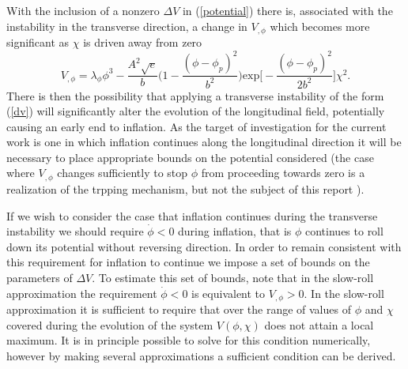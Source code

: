 \documentclass[letterpaper,11pt]{article}
\begin{document}
With the inclusion of a nonzero $\Delta V$ in (\ref{potential}) there is, associated with the instability in the transverse direction, a change in $V_{,\phi}$ which becomes more significant as $\chi$ is driven away from zero
\begin{equation}
V_{,\phi} = \lambda_{\phi}\phi^3 - \frac{A^2\sqrt{e}}{b}\bigg(1 - \frac{(\phi-\phi_p)^2}{b^2}\bigg)\mathrm{exp}\bigg[-\frac{(\phi-\phi_p)^2}{2b^2}\bigg]\chi^2. \label{dv phi}
\end{equation}
There is then the possibility that applying a transverse instability of the form (\ref{dv}) will significantly alter the evolution of the longitudinal field, potentially causing an early end to inflation. As the target of investigation for the current work is one in which inflation continues along the longitudinal direction it will be necessary to place appropriate bounds on the potential considered (the case where $V_{,\phi}$ changes sufficiently to stop $\phi$ from proceeding towards zero is a realization of the trpping mechanism, but not the subject of this report \cite{kofman}).

If we wish to consider the case that inflation continues during the transverse instability we should require $\dot{\phi}<0$ during inflation, that is $\phi$ continues to roll down its potential without reversing direction. In order to remain consistent with this requirement for inflation to continue we impose a set of bounds on the parameters of $\Delta V$. To estimate this set of bounds, note that in the slow-roll approximation the requirement $\dot{\phi}<0$ is equivalent to $V_{,\phi}>0$. In the slow-roll approximation it is sufficient to require that over the range of values of $\phi$ and $\chi$ covered during the evolution of the system $V(\phi, \chi)$ does not attain a local maximum. It is in principle possible to solve for this condition numerically, however by making several approximations a sufficient condition can be derived.
\end{document}
